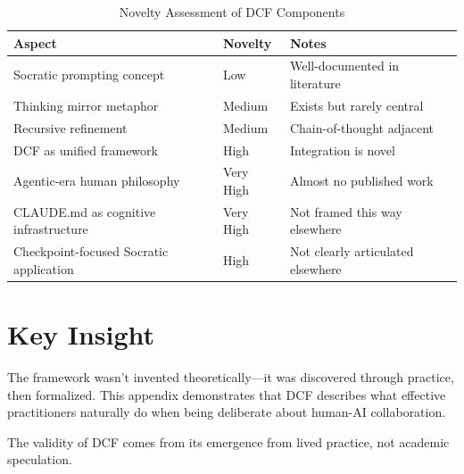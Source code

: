 \begin{table}[H]
\centering
\begin{tabular}{lll}
\toprule
\textbf{Aspect} & \textbf{Novelty} & \textbf{Notes} \\
\midrule
Socratic prompting concept & Low & Well-documented in literature \\
Thinking mirror metaphor & Medium & Exists but rarely central \\
Recursive refinement & Medium & Chain-of-thought adjacent \\
DCF as unified framework & High & Integration is novel \\
Agentic-era human philosophy & Very High & Almost no published work \\
CLAUDE.md as cognitive infrastructure & Very High & Not framed this way elsewhere \\
Checkpoint-focused Socratic application & High & Not clearly articulated elsewhere \\
\bottomrule
\end{tabular}
\caption{Novelty Assessment of DCF Components}
\end{table}

\section{Key Insight}

The framework wasn't invented theoretically---it was discovered through practice, then formalized. This appendix demonstrates that DCF describes what effective practitioners naturally do when being deliberate about human-AI collaboration.

The validity of DCF comes from its emergence from lived practice, not academic speculation.


